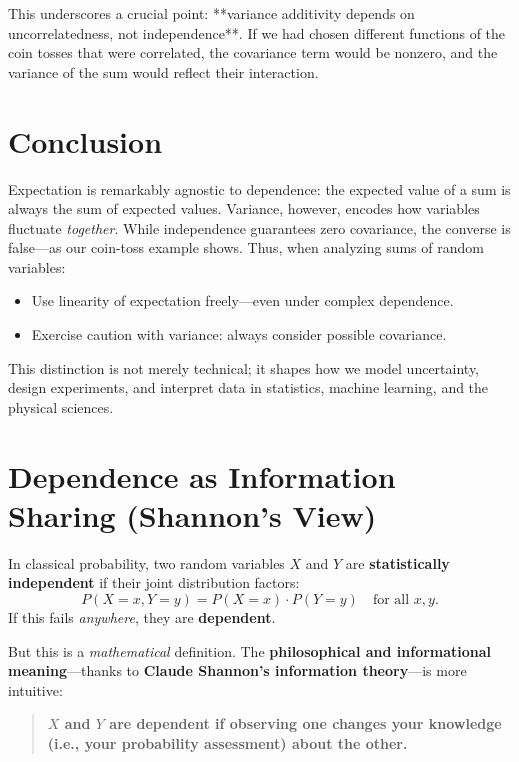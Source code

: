 \documentclass{article}
\begin{document}
This underscores a crucial point: **variance additivity depends on uncorrelatedness, not independence**. If we had chosen different functions of the coin tosses that were correlated, the covariance term would be nonzero, and the variance of the sum would reflect their interaction.

\section*{Conclusion}

Expectation is remarkably agnostic to dependence: the expected value of a sum is always the sum of expected values. Variance, however, encodes how variables fluctuate \textit{together}. While independence guarantees zero covariance, the converse is false—as our coin-toss example shows. Thus, when analyzing sums of random variables:

\begin{itemize}
\item Use linearity of expectation freely—even under complex dependence.
    \item Exercise caution with variance: always consider possible covariance.
\end{itemize}

This distinction is not merely technical; it shapes how we model uncertainty, design experiments, and interpret data in statistics, machine learning, and the physical sciences.



\section*{Dependence as Information Sharing (Shannon’s View)}

In classical probability, two random variables \(X\) and \(Y\) are \textbf{statistically independent} if their joint distribution factors:
\[
P(X = x, Y = y) = P(X = x) \cdot P(Y = y) \quad \text{for all } x, y.
\]
If this fails \textit{anywhere}, they are \textbf{dependent}.

But this is a \textit{mathematical} definition. The \textbf{philosophical and informational meaning}—thanks to \textbf{Claude Shannon’s information theory}—is more intuitive:

\begin{quote}
    \textbf{\(X\) and \(Y\) are dependent if observing one changes your knowledge (i.e., your probability assessment) about the other.}
\end{quote}
\end{document}
